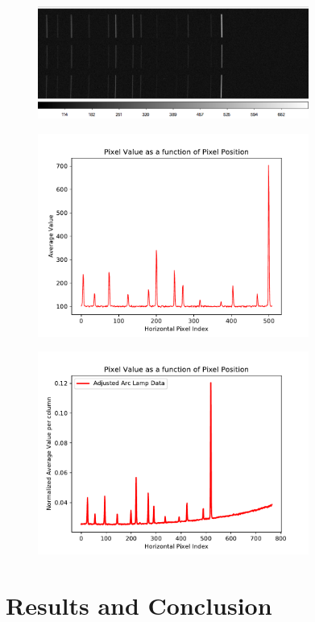 \documentclass[preprint]{aastex62}
\begin{document}
        \begin{figure}
          \centering
            \includegraphics[width=3.5in]{../images/masterflat_lamp.png}
            \caption{}
          \label{fig:masterflat_lamp}
        \end{figure}
        \begin{figure}
          \centering
            \includegraphics[width=3.5in]{../images/spectrograph_crop_values-Lamp.pdf}
            \caption{}
          \label{fig:spectrograph_crop_values-Lamp}
        \end{figure}
        \begin{figure}
          \centering
            \includegraphics[width=3.5in]{../images/spectrograph_lampadj_fit.pdf}
            \caption{}
          \label{fig:spectrograph_lampadj_fit}
        \end{figure}
    
    
    

\section{Results and Conclusion}
\end{document}
